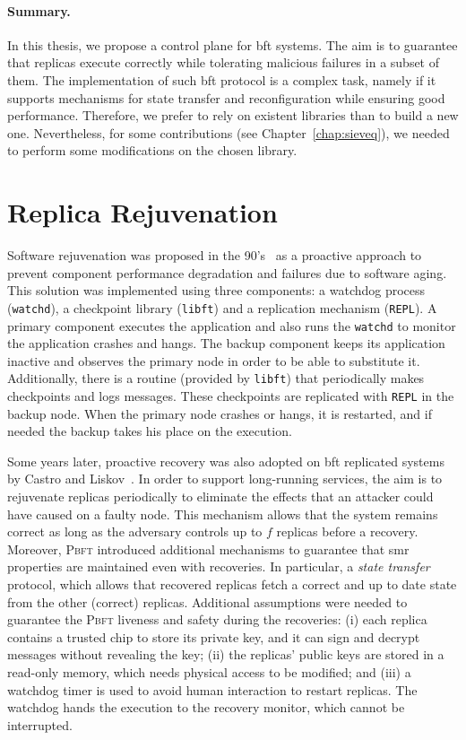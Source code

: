 \paragraph{Summary.} 

In this thesis, we propose a control plane for \gls{bft} systems.
The aim is to guarantee that replicas execute correctly while tolerating malicious failures in a subset of them.
The implementation of such \gls{bft} protocol is a complex task, namely if it supports mechanisms for state transfer and reconfiguration while ensuring good performance.
Therefore, we prefer to rely on existent libraries than to build a new one.
Nevertheless, for some contributions (see Chapter~\ref{chap:sieveq}), we needed to perform some modifications on the chosen library.



\section{Replica Rejuvenation}
Software rejuvenation was proposed in the 90's~\cite{Huang:1993,Huang:1995} as a proactive approach to prevent component performance degradation and failures due to software aging. 
This solution was implemented using three components: a watchdog process (\texttt{watchd}), a checkpoint library (\texttt{libft}) and a replication mechanism (\texttt{REPL}). 
A primary component executes the application and also runs the \texttt{watchd} to monitor the application crashes and hangs. 
The backup component keeps its application inactive and observes the primary node in order to be able to substitute it. 
Additionally, there is a routine (provided by \texttt{libft}) that periodically makes checkpoints and logs messages. 
These checkpoints are replicated with \texttt{REPL} in the backup node. 
When the primary node crashes or hangs, it is restarted, and if needed the backup takes his place on the execution.


Some years later, proactive recovery was also adopted on \gls{bft} replicated systems by Castro and Liskov~\cite{Castro:2002}.
In order to support long-running services, the aim is to rejuvenate replicas periodically to eliminate the effects that an attacker could have caused on a faulty node. 
This mechanism allows that the system remains correct as long as the adversary controls up to $f$ replicas before a recovery.
Moreover, \textsc{Pbft} introduced additional mechanisms to guarantee that \gls{smr} properties are maintained even with recoveries.
In particular, a \emph{state transfer} protocol, which allows that recovered replicas fetch a correct and up to date state from the other (correct) replicas.
Additional assumptions were needed to guarantee the \textsc{Pbft} liveness and safety during the recoveries: 
(i) each replica contains a trusted chip to store its private key, and it can sign and decrypt messages without revealing the key; 
(ii) the replicas' public keys are stored in a read-only memory, which needs physical access to be modified; 
and (iii) a watchdog timer is used to avoid human interaction to restart replicas.
The watchdog hands the execution to the recovery monitor, which cannot be interrupted.

